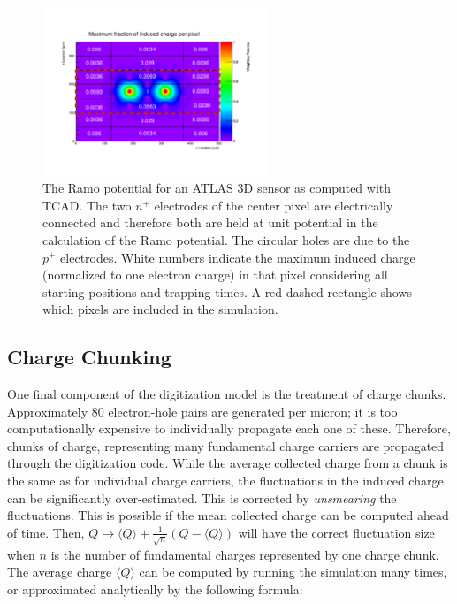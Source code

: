 \begin{figure}[!htpb]
\centering
\includegraphics[width=0.6\textwidth]{Maximum3D_mod.pdf}
\caption{The Ramo potential for an ATLAS 3D sensor as computed with TCAD.  The two $n^+$ electrodes of the center pixel are electrically connected and therefore both are held at unit potential in the calculation of the Ramo potential.  The circular holes are due to the $p^+$ electrodes.  White numbers indicate the maximum induced charge (normalized to one electron charge) in that pixel considering all starting positions and trapping times.  A red dashed rectangle shows which pixels are included in the simulation.}
\label{fig:ramo:3D}
\end{figure}

\subsection{Charge Chunking}
\label{sec:chunking}

One final component of the digitization model is the treatment of charge chunks.  Approximately 80 electron-hole pairs are generated per micron; it is too computationally expensive to individually propagate each one of these.  Therefore, chunks of charge, representing many fundamental charge carriers are propagated through the digitization code.  While the average collected charge from a chunk is the same as for individual charge carriers, the fluctuations in the induced charge can be significantly over-estimated.  This is corrected by \textit{unsmearing} the fluctuations.  This is possible if the mean collected charge can be computed ahead of time.  Then, $Q\rightarrow \langle Q\rangle+\frac{1}{\sqrt{n}}(Q-\langle Q\rangle)$ will have the correct fluctuation size when $n$ is the number of fundamental charges represented by one charge chunk.  The average charge $\langle Q\rangle$ can be computed by running the simulation many times, or approximated analytically by the following formula:

